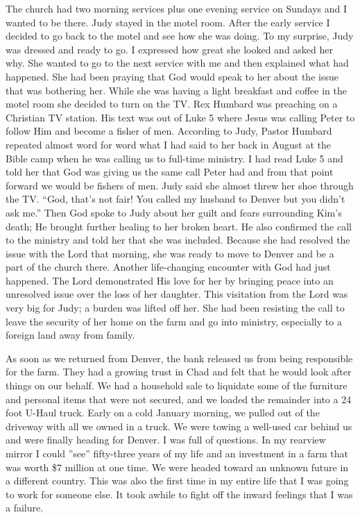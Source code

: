 \documentclass[twoside, 12pt]{book}
\begin{document}
The church had two morning services plus one evening service on Sundays and I wanted to be there. Judy stayed in the motel room. After the early service I decided to go back to the motel and see how she was doing. To my surprise, Judy was dressed and ready to go. I expressed how great she looked and asked her why. She wanted to go to the next service with me and then explained what had happened. She had been praying that God would speak to her about the issue that was bothering her. While she was having a light breakfast and coffee in the motel room she decided to turn on the TV. Rex Humbard was preaching on a Christian TV station. His text was out of Luke 5 where Jesus was calling Peter to follow Him and become a fisher of men. According to Judy, Pastor Humbard repeated almost word for word what I had said to her back in August at the Bible camp when he was calling us to full-time ministry. I had read Luke 5 and told her that God was giving us the same call Peter had and from that point forward we would be fishers of men. Judy said she almost threw her shoe through the TV. “God, that’s not fair! You called my husband to Denver but you didn’t ask me.” Then God spoke to Judy about her guilt and fears surrounding Kim’s death; He brought further healing to her broken heart. He also confirmed the call to the ministry and told her that she was included. Because she had resolved the issue with the Lord that morning, she was ready to move to Denver and be a part of the church there. Another life-changing encounter with God had just happened. The Lord demonstrated His love for her by bringing peace into an unresolved issue over the loss of her daughter. This visitation from the Lord was very big for Judy; a burden was lifted off her. She had been resisting the call to leave the security of her home on the farm and go into ministry, especially to a foreign land away from family.

As soon as we returned from Denver, the bank released us from being responsible for the farm. They had a growing trust in Chad and felt that he would look after things on our behalf. We had a household sale to liquidate some of the furniture and personal items that were not secured, and we loaded the remainder into a 24 foot U-Haul truck. Early on a cold January morning, we pulled out of the driveway with all we owned in a truck. We were towing a well-used car behind us and were finally heading for Denver. I was full of questions. In my rearview mirror I could ”see” fifty-three years of my life and an investment in a farm that was worth \$7 million at one time. We were headed toward an unknown future in a different country. This was also the first time in my entire life that I was going to work for someone else. It took awhile to fight off the inward feelings that I was a failure.
\end{document}
